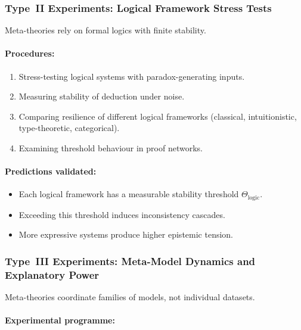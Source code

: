 \subsubsection{Type~II Experiments: Logical Framework Stress Tests}

Meta-theories rely on formal logics with finite stability.

\paragraph{Procedures:}

\begin{enumerate}
    \item Stress-testing logical systems with paradox-generating inputs.
    \item Measuring stability of deduction under noise.
    \item Comparing resilience of different logical frameworks 
          (classical, intuitionistic, type-theoretic, categorical).
    \item Examining threshold behaviour in proof networks.
\end{enumerate}

\paragraph{Predictions validated:}

\begin{itemize}
    \item Each logical framework has a measurable stability threshold 
          $\Theta_{\mathrm{logic}}$.
    \item Exceeding this threshold induces inconsistency cascades.
    \item More expressive systems produce higher epistemic tension.
\end{itemize}



\subsubsection{Type~III Experiments: Meta-Model Dynamics and Explanatory Power}

Meta-theories coordinate families of models, not individual datasets.

\paragraph{Experimental programme:}

